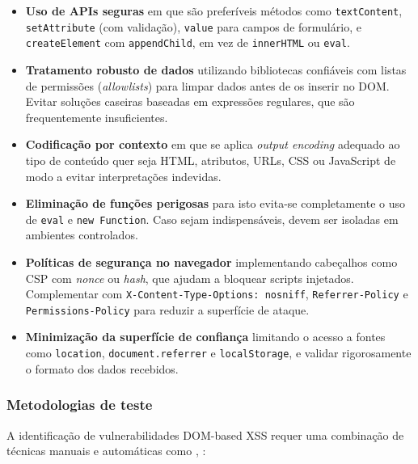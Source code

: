 \begin{itemize}
    \item \textbf{Uso de APIs seguras} em que são preferíveis métodos como \texttt{textContent}, \texttt{setAttribute} (com validação), \texttt{value} para campos de formulário, e \texttt{createElement} com \texttt{appendChild}, em vez de \texttt{innerHTML} ou \texttt{eval}.
    
    \item \textbf{Tratamento robusto de dados} utilizando bibliotecas confiáveis com listas de permissões (\textit{allowlists}) para limpar dados antes de os inserir no DOM. Evitar soluções caseiras baseadas em expressões regulares, que são frequentemente insuficientes.
    
    \item \textbf{Codificação por contexto} em que se aplica \textit{output encoding} adequado ao tipo de conteúdo quer seja HTML, atributos, URLs, CSS ou JavaScript de modo a evitar interpretações indevidas.
    
    \item \textbf{Eliminação de funções perigosas} para isto evita-se completamente o uso de \texttt{eval} e \texttt{new Function}. Caso sejam indispensáveis, devem ser isoladas em ambientes controlados.
    
    \item \textbf{Políticas de segurança no navegador} implementando cabeçalhos como CSP com \textit{nonce} ou \textit{hash}, que ajudam a bloquear scripts injetados. Complementar com \texttt{X-Content-Type-Options: nosniff}, \texttt{Referrer-Policy} e \texttt{Permissions-Policy} para reduzir a superfície de ataque.
    
    \item \textbf{Minimização da superfície de confiança} limitando o acesso a fontes como \texttt{location}, \texttt{document.referrer} e \texttt{localStorage}, e validar rigorosamente o formato dos dados recebidos.
\end{itemize}

\subsubsection{Metodologias de teste}
\label{subsubsec:metodologias-teste-dom-xss}

A identificação de vulnerabilidades DOM-based XSS requer uma combinação de técnicas manuais e automáticas como \cite{ref29}, \cite{ref33}:

